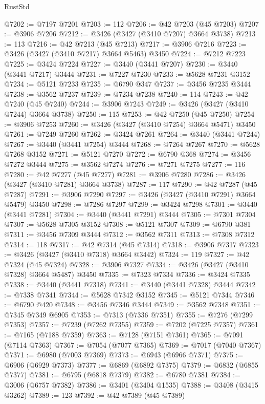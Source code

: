 \begin{lexlean}{RustStd}
\begin{coremodule}
@7202 := @7197 @7201
@7203 := 112
@7206 := @42 @7203 (@45 @7203)
@7207 := @3906 @7206
@7212 := @3426 (@3427 (@3410 @7207) @3664 @3738)
@7213 := 113
@7216 := @42 @7213 (@45 @7213)
@7217 := @3906 @7216
@7223 := @3426 (@3427 (@3410 @7217) @3664 @5463) @3450
@7224 := @7212 @7223
@7225 := @3424 @7224
@7227 := @3440 (@3441 @7207)
@7230 := @3440 (@3441 @7217) @3444
@7231 := @7227 @7230
@7233 := @5628 @7231 @3152
@7234 := @5121 @7233
@7235 := @6790 @347
@7237 := @3456 @7235 @3444
@7238 := @3562 @7237
@7239 := @7234 @7238
@7240 := 114
@7243 := @42 @7240 (@45 @7240)
@7244 := @3906 @7243
@7249 := @3426 (@3427 (@3410 @7244) @3664 @3738)
@7250 := 115
@7253 := @42 @7250 (@45 @7250)
@7254 := @3906 @7253
@7260 := @3426 (@3427 (@3410 @7254) @3664 @5471) @3450
@7261 := @7249 @7260
@7262 := @3424 @7261
@7264 := @3440 (@3441 @7244)
@7267 := @3440 (@3441 @7254) @3444
@7268 := @7264 @7267
@7270 := @5628 @7268 @3152
@7271 := @5121 @7270
@7272 := @6790 @368
@7274 := @3456 @7272 @3444
@7275 := @3562 @7274
@7276 := @7271 @7275
@7277 := 116
@7280 := @42 @7277 (@45 @7277)
@7281 := @3906 @7280
@7286 := @3426 (@3427 (@3410 @7281) @3664 @3738)
@7287 := 117
@7290 := @42 @7287 (@45 @7287)
@7291 := @3906 @7290
@7297 := @3426 (@3427 (@3410 @7291) @3664 @5479) @3450
@7298 := @7286 @7297
@7299 := @3424 @7298
@7301 := @3440 (@3441 @7281)
@7304 := @3440 (@3441 @7291) @3444
@7305 := @7301 @7304
@7307 := @5628 @7305 @3152
@7308 := @5121 @7307
@7309 := @6790 @381
@7311 := @3456 @7309 @3444
@7312 := @3562 @7311
@7313 := @7308 @7312
@7314 := 118
@7317 := @42 @7314 (@45 @7314)
@7318 := @3906 @7317
@7323 := @3426 (@3427 (@3410 @7318) @3664 @3442)
@7324 := 119
@7327 := @42 @7324 (@45 @7324)
@7328 := @3906 @7327
@7334 := @3426 (@3427 (@3410 @7328) @3664 @5487) @3450
@7335 := @7323 @7334
@7336 := @3424 @7335
@7338 := @3440 (@3441 @7318)
@7341 := @3440 (@3441 @7328) @3444
@7342 := @7338 @7341
@7344 := @5628 @7342 @3152
@7345 := @5121 @7344
@7346 := @6790 @420
@7348 := @3456 @7346 @3444
@7349 := @3562 @7348
@7351 := @7345 @7349 @6905
@7353 := @7313 (@7336 @7351)
@7355 := @7276 (@7299 @7353)
@7357 := @7239 (@7262 @7355)
@7359 := @7202 (@7225 @7357)
@7361 := @7165 (@7188 @7359)
@7363 := @7128 (@7151 @7361)
@7365 := @7091 (@7114 @7363)
@7367 := @7054 (@7077 @7365)
@7369 := @7017 (@7040 @7367)
@7371 := @6980 (@7003 @7369)
@7373 := @6943 (@6966 @7371)
@7375 := @6906 (@6929 @7373)
@7377 := @6869 (@6892 @7375)
@7379 := @6832 (@6855 @7377)
@7381 := @6795 (@6818 @7379)
@7382 := @6780 @7381
@7384 := @3006 (@6757 @7382)
@7386 := @3401 (@3404 @1535)
@7388 := @3408 (@3415 @3262)
@7389 := 123
@7392 := @42 @7389 (@45 @7389)

\end{coremodule}
\end{lexlean}
